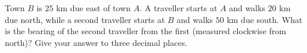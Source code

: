Town $B$ is $25$ km due east of town $A$. A traveller starts at $A$ and walks $20$ km due north, while a second traveller starts at $B$ and walks $50$ km due south. What is the bearing of the second traveller from the first (measured clockwise from north)? Give your answer to three decimal places.

